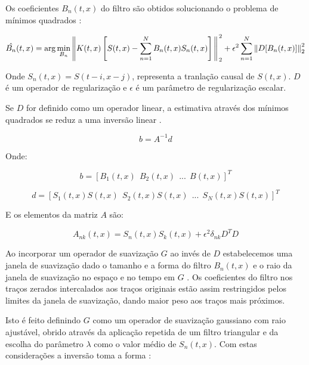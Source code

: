 Os coeficientes $B_n(t,x)$ do filtro são obtidos
solucionando o problema de mínimos quadrados \cite{liu11}:

\begin{equation}
\label{eq:4.1}
\hat{B_n}(t,x) = \arg \min_{B_n} \left \rVert K(t,x) \left [ S(t,x) - \sum^N_{n=1}B_n(t,x)S_n(t,x) \right ] \right \Arrowvert^2_2 
+ \epsilon^2 \sum^N_{n=1} \left \rVert D [ B_n(t,x) ] \right \Arrowvert^2_2
\end{equation}

Onde $S_n(t,x) = S(t-i,x-j)$, representa a tranlação causal de $S(t,x)$. 
$D$ é um operador de regularização e $\epsilon$ é um parâmetro de regularização escalar.

Se $D$ for definido como um operador linear, a estimativa através dos mínimos quadrados se reduz a uma
inversão linear \cite{liu11, fomel2009}.

\begin{equation}
 b = A^{-1} d
\end{equation}

Onde:

\begin{equation}
 b = \left[ B_1(t,x)\:\: B_2(t,x)\:\: ...\:\: B(t,x) \right]^T
\end{equation}

\begin{equation}
 d = \left[ S_1(t,x)S(t,x)\:\: S_2(t,x)S(t,x)\:\: ... \:\: S_N(t,x)S(t,x) \right]^T
\end{equation}

E os elementos da matriz $A$ são:

\begin{equation}
 A_{nk}(t,x) = S_n(t,x)S_k(t,x) + \epsilon^2 \delta_{nk}D^TD
\end{equation}

Ao incorporar um operador de suavização $G$ ao invés de $D$ estabelecemos uma janela de suavização
dado o tamanho e a forma do filtro $B_n(t,x)$ e o raio da janela de suavização no espaço e no tempo em $G$ \cite{fomel2007}.
Os coeficientes do filtro nos traços zerados intercalados aos traços originais estão assim restringidos pelos limites
da janela de suavização, dando maior peso aos traços mais próximos.

Isto é feito definindo $G$ como um operador de suavização gaussiano com raio ajustável, obrido através da
aplicação repetida de um filtro triangular e da escolha do parâmetro $\lambda$ como o valor médio de $S_n(t,x)$.
Com estas considerações a inversão toma a forma \cite{liu11, fomel2007}:

